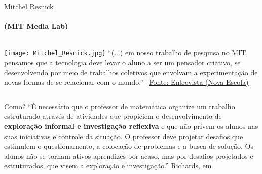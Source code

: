 \documentclass[10pt,]{beamer}
\begin{document}
\begin{frame}{Mitchel Resnick}
  \framesubtitle{(MIT Media Lab)}
  \begin{columns}
    \column{5cm}
    \texttt{[image: Mitchel\_Resnick.jpg]}
    \column{6cm}
    ``(...) em nosso trabalho de pesquisa no MIT, pensamos que a tecnologia deve levar o aluno a ser um pensador criativo, se desenvolvendo por meio de trabalhos coletivos que envolvam a experimentação de novas formas de se relacionar com o mundo.''
    \vfill
    \textemdash\ \href{https://novaescola.org.br/conteudo/905/mitchel-resnick-a-tecnologia-deve-levar-o-aluno-a-ser-um-pensador-criativo}{Fonte: Entrevista (Nova Escola)}
  \end{columns}
\end{frame}

\begin{frame}{Como?}
  ``É necessário que o professor de matemática organize um trabalho estruturado através de atividades que propiciem o desenvolvimento de \textbf{exploração informal e investigação reflexiva} e que não privem os alunos nas suas iniciativas e controle da situação. O professor deve projetar desafios que estimulem o questionamento, a colocação de problemas e a busca de solução. Os alunos não se tornam ativos aprendizes por acaso, mas por desafios projetados e estruturados, que visem a exploração e investigação.''
  \vfill
  Richards, em \cite{richards}
\end{frame}


\end{document}
